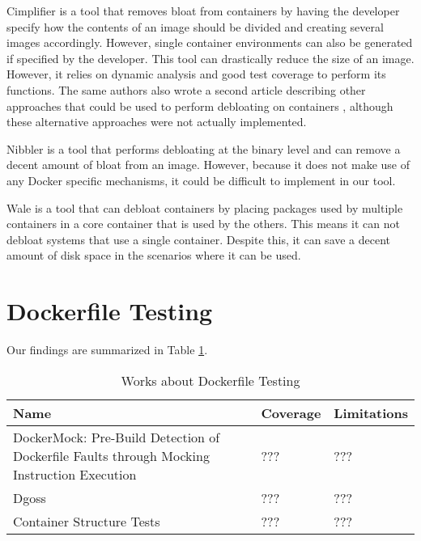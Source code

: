 Cimplifier \cite{rastogiCimplifierAutomaticallyDebloating2017} is a tool that removes bloat from containers by having the developer specify how the contents of an image should be divided and creating several images accordingly. However, single container environments can also be generated if specified by the developer. This tool can drastically reduce the size of an image. However, it relies on dynamic analysis and good test coverage to perform its functions. The same authors also wrote a second article describing other approaches that could be used to perform debloating on containers \cite{rastogiNewDirectionsContainer2017}, although these alternative approaches were not actually implemented.

Nibbler \cite{agadakosLargescaleDebloatingBinary2020} is a tool that performs debloating at the binary level and can remove a decent amount of bloat from an image. However, because it does not make use of any Docker specific mechanisms, it could be difficult to implement in our tool.

Wale \cite{santoroWaleDockerfileBasedApproach2018} is a tool that can debloat containers by placing packages used by multiple containers in a core container that is used by the others. This means it can not debloat systems that use a single container. Despite this, it can save a decent amount of disk space in the scenarios where it can be used.

\section{Dockerfile Testing} \label{sec:dockerfile_testing}

Our findings are summarized in Table \ref{tab:works_dockerfile_testing}.

\begin{table}[H]
    \centering
    \begin{tabular}{|p{}|p{}|p{}|}
        \hline \textbf{Name} & \textbf{Coverage} & \textbf{Limitations} \\
        \hline DockerMock: Pre-Build Detection of Dockerfile Faults through Mocking Instruction Execution \cite{liDockerMockPreBuildDetection2021} & ??? & ??? \\
        \hline Dgoss \footnotemark[7]{} & ??? & ??? \\
        \hline Container Structure Tests \footnotemark[8]{} & ??? & ??? \\
        \hline
    \end{tabular}
    \caption{Works about Dockerfile Testing}
    \label{tab:works_dockerfile_testing}
\end{table}


